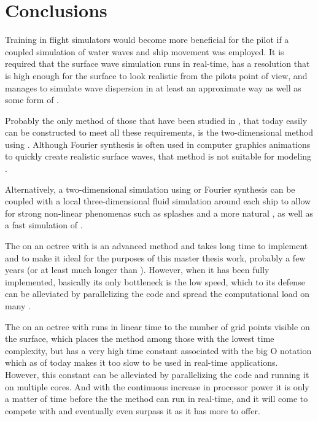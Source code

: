 \chapter{Conclusions}

Training in flight simulators would become more beneficial for the pilot if a coupled simulation of water waves and ship movement was employed. It is required that the surface wave simulation runs in real-time, has a resolution that is high enough for the surface to look realistic from the pilots point of view, and manages to simulate wave dispersion in at least an approximate way as well as some form of \FSI.

Probably the only method of those that have been studied in \thismasterthesiswork, that today easily can be constructed to meet all these requirements, is the two-dimensional method using \LPD. Although Fourier synthesis is often used in computer graphics animations to quickly create realistic surface waves, that method is not suitable for modeling \FSI.

Alternatively, a two-dimensional simulation using \LPD or Fourier synthesis can be coupled with a local three-dimensional fluid simulation around each ship to allow for strong non-linear phenomenas such as splashes and a more natural \FSI, as well as a fast simulation of .

The \FVM on an octree with \FSM is an advanced method and takes long time to implement and to make it ideal for the purposes of this master thesis work, probably a few years (or at least much longer than \masterthesisworktime). However, when it has been fully implemented, basically its only bottleneck is the low speed, which to its defense can be alleviated by parallelizing the code and spread the computational load on many \CPUs.

The \FVM on an octree with \FSM runs in linear time to the number of grid points visible on the surface, which places the method among those with the lowest time complexity, but has a very high time constant associated with the big O notation which as of today makes it too slow to be used in real-time applications. However, this constant can be alleviated by parallelizing the code and running it on multiple cores. And with the continuous increase in processor power it is only a matter of time before the the method can run in real-time, and it will come to compete with \LPD and eventually even surpass it as it has more to offer.